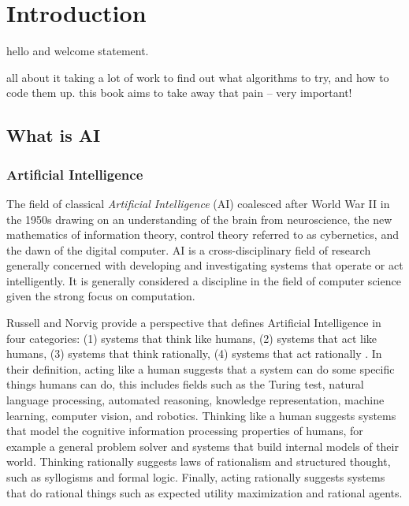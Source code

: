 

\chapter{Introduction}
\label{chap:intro}

hello and welcome statement.

all about it taking a lot of work to find out what algorithms to try, and how to code them up. this book aims to take away that pain -- very important!


% 
% 
\section{What is AI}
\label{intro:sec:what_is_ai}
% 
% 
\subsection{Artificial Intelligence}
\label{sec:artificial_intelligence}
The field of classical \emph{Artificial Intelligence} (AI) coalesced after World War II in the 1950s drawing on an understanding of the brain from neuroscience, the new mathematics of information theory, control theory referred to as cybernetics, and the dawn of the digital computer. AI is a cross-disciplinary field of research generally concerned with developing and investigating systems that operate or act intelligently. It is generally considered a discipline in the field of computer science given the strong focus on computation.

Russell and Norvig provide a perspective that defines Artificial Intelligence in four categories: (1) systems that think like humans, (2) systems that act like humans, (3) systems that think rationally, (4) systems that act rationally \cite{Russell2009}. In their definition, acting like a human suggests that a system can do some specific things humans can do, this includes fields such as the Turing test, natural language processing, automated reasoning, knowledge representation, machine learning, computer vision, and robotics. Thinking like a human suggests systems that model the cognitive information processing properties of humans, for example a general problem solver and systems that build internal models of their world. Thinking rationally suggests laws of rationalism and structured thought, such as syllogisms and formal logic. Finally, acting rationally suggests systems that do rational things such as expected utility maximization and rational agents. 

